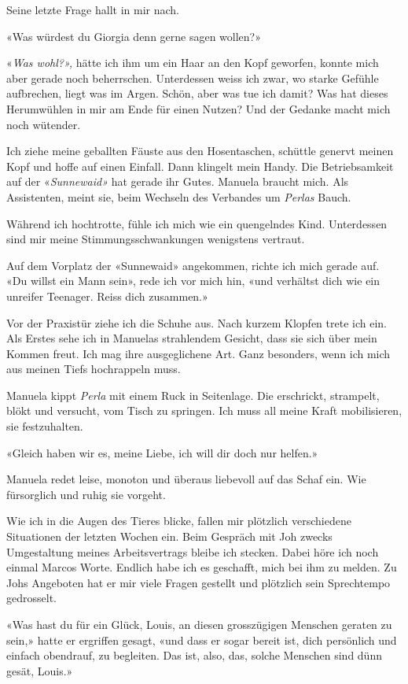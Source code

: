 Seine letzte Frage hallt in mir nach.

«Was würdest du Giorgia denn gerne sagen wollen?»

«\emph{Was wohl?»,} hätte ich ihm um ein Haar an den Kopf geworfen,
konnte mich aber gerade noch beherrschen. Unterdessen weiss ich zwar, wo
starke Gefühle aufbrechen, liegt was im Argen. Schön, aber was tue ich
damit? Was hat dieses Herumwühlen in mir am Ende für einen Nutzen? Und
der Gedanke macht mich noch wütender.

Ich ziehe meine geballten Fäuste aus den Hosentaschen, schüttle genervt
meinen Kopf und hoffe auf einen Einfall. Dann klingelt mein Handy. Die
Betriebsamkeit auf der «\emph{Sunnewaid»} hat gerade ihr Gutes. Manuela
braucht mich. Als Assistenten, meint sie, beim Wechseln des Verbandes um
\emph{Perlas} Bauch.

Während ich hochtrotte, fühle ich mich wie ein quengelndes Kind.
Unterdessen sind mir meine Stimmungsschwankungen wenigstens vertraut.

Auf dem Vorplatz der «Sunnewaid» angekommen, richte ich mich gerade auf.
«Du willst ein Mann sein», rede ich vor mich hin, «und verhältst dich
wie ein unreifer Teenager. Reiss dich zusammen.»

Vor der Praxistür ziehe ich die Schuhe aus. Nach kurzem Klopfen trete
ich ein. Als Erstes sehe ich in Manuelas strahlendem Gesicht, dass sie
sich über mein Kommen freut. Ich mag ihre ausgeglichene Art. Ganz
besonders, wenn ich mich aus meinen Tiefs hochrappeln muss.

Manuela kippt \emph{Perla} mit einem Ruck in Seitenlage. Die erschrickt,
strampelt, blökt und versucht, vom Tisch zu springen. Ich muss all meine
Kraft mobilisieren, sie festzuhalten.

«Gleich haben wir es, meine Liebe, ich will dir doch nur helfen.»

Manuela redet leise, monoton und überaus liebevoll auf das Schaf ein.
Wie fürsorglich und ruhig sie vorgeht.

Wie ich in die Augen des Tieres blicke, fallen mir plötzlich
verschiedene Situationen der letzten Wochen ein. Beim Gespräch mit Joh
zwecks Umgestaltung meines Arbeitsvertrags bleibe ich stecken. Dabei
höre ich noch einmal Marcos Worte. Endlich habe ich es geschafft, mich
bei ihm zu melden. Zu Johs Angeboten hat er mir viele Fragen gestellt
und plötzlich sein Sprechtempo gedrosselt.

«Was hast du für ein Glück, Louis, an diesen grosszügigen Menschen
geraten zu sein,» hatte er ergriffen gesagt, «und dass er sogar bereit
ist, dich persönlich und einfach obendrauf, zu begleiten. Das ist, also,
das, solche Menschen sind dünn gesät, Louis.»

